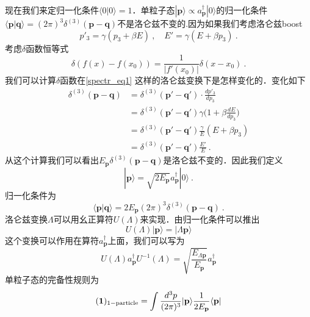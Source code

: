 现在我们来定归一化条件$\langle 0 | 0 \rangle = 1$．单粒子态$|\mathbf p\rangle \propto a^\dagger_{\mathbf p} | 0 \rangle$的归一化条件$\langle \mathbf p| \mathbf q\rangle = (2\pi)^3\delta^{(3)}(\mathbf p - \mathbf q)$不是洛仑兹不变的.因为如果我们考虑洛仑兹boost
\begin{equation}\label{spectr_eq1}
p'_3 = \gamma (p_3+\beta E)~,\quad E' = \gamma(E+\beta p_3)~.
\end{equation}
考虑$\delta$函数恒等式
\begin{equation}
\delta (f(x) - f(x_0)) = \frac{1}{|f'(x_0)|}\delta(x-x_0)~.
\end{equation}
我们可以计算$\delta$函数在\autoref{spectr_eq1} 这样的洛仑兹变换下是怎样变化的．变化如下
\begin{equation}
\begin{aligned}
\delta^{(3)}(\mathbf p - \mathbf q) & = \delta^{(3)}(\mathbf p' - \mathbf q') \cdot \frac{dp'_3}{dp_3}\\
& = \delta^{(3)}(\mathbf p' - \mathbf q') \gamma \bigg( 1+\beta \frac{dE}{dp_3} \bigg) \\
& = \delta^{(3)}(\mathbf p' - \mathbf q') \frac{\gamma}{E} (E+ \beta p_3) \\
& = \delta^{(3)} (\mathbf p'-\mathbf q') \frac{E'}{E}~.
\end{aligned}
\end{equation}
从这个计算我们可以看出$E_{\mathbf p}\delta^{(3)}(\mathbf p - \mathbf q)$是洛仑兹不变的．因此我们定义
\begin{equation}
|\mathbf p \rangle = \sqrt{2 E_{\mathbf p}} a^\dagger_{\mathbf p} | 0 \rangle~.
\end{equation}
归一化条件为
\begin{equation}
\langle \mathbf p | \mathbf q \rangle = 2 E_{\mathbf p} (2\pi)^3 \delta^{(3)} (\mathbf p - \mathbf q)~. 
\end{equation}
洛仑兹变换$\Lambda$可以用幺正算符$U(\Lambda)$来实现．由归一化条件可以推出
\begin{equation}
U(\Lambda)|\mathbf p\rangle = |\Lambda \mathbf p \rangle 
\end{equation}
这个变换可以作用在算符$a^\dagger_{\mathbf p}$上面，我们可以写为
\begin{equation}
U(\Lambda)a^\dagger_{\mathbf p}U^{-1}(\Lambda) = \sqrt{\frac{E_{\Lambda \mathbf p}}{E_{\mathbf p}}} a^\dagger_{\mathbf p}
\end{equation}
单粒子态的完备性规则为
\begin{equation}
(\boldsymbol 1)_{\rm 1-particle} = \int \frac{d^3p}{(2\pi)^3} |\mathbf p\rangle \frac{1}{2 E_{\mathbf p}} \langle \mathbf p |
\end{equation}

